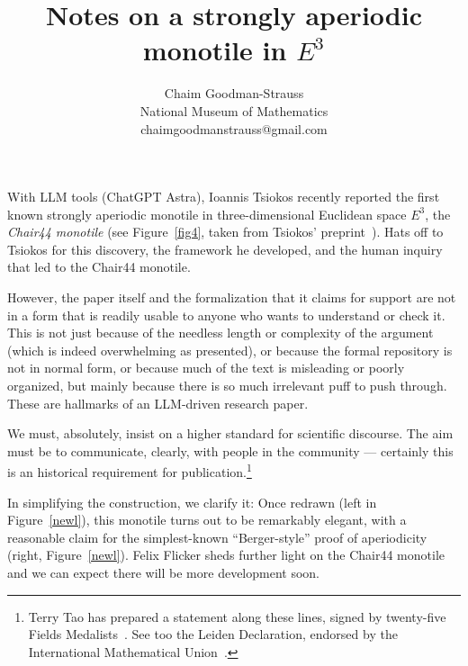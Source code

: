 \documentclass[11pt, oneside]{article}
\title{ Notes on a strongly aperiodic monotile in $E^3$}
\author{\small Chaim Goodman-Strauss\\\small  National Museum of Mathematics\\\small  chaimgoodmanstrauss@gmail.com}
\date{}
\def\vp{\vspace{3ex}}
\begin{document}
\maketitle


\vp
\vp


 With LLM tools (ChatGPT Astra),
Ioannis Tsiokos recently reported the first known strongly aperiodic monotile in three-dimensional Euclidean space $E^3$, the {\em Chair44 monotile} (see Figure~\ref{fig4}, taken from Tsiokos' preprint~\cite{ioannis}).
 Hats off to Tsiokos for this discovery, the framework he developed, and the human inquiry that led to the Chair44 monotile. 

\vp

However, the paper itself and the formalization that it claims for support are  not in a form that is readily usable to anyone who wants to understand or check it. This is  not just because of the needless length or complexity of the argument (which is indeed overwhelming as presented), or because the formal repository  is not in normal form, or because much of the text is misleading or poorly organized, but mainly because there is so much irrelevant puff to push through. These are hallmarks of an LLM-driven research paper. 

We must, absolutely, insist on a higher standard for scientific discourse. The aim must be to communicate, clearly, with people in the community --- certainly this is an historical requirement for publication.\footnote{
 Terry Tao has prepared a statement along these lines, signed by twenty-five Fields Medalists~\cite{tao}. See too the Leiden Declaration, endorsed by the International Mathematical Union~\cite{leiden}.}


\vp In simplifying the construction, we clarify it: Once redrawn (left in Figure~\ref{newl}), this monotile turns out to be remarkably elegant,  with a reasonable claim for the simplest-known ``Berger-style'' proof of aperiodicity~\cite{berger} (right, Figure~\ref{newl}).  Felix Flicker sheds further light on the Chair44 monotile~\cite{flicker} and we can expect there will be more development soon. 
\end{document}
